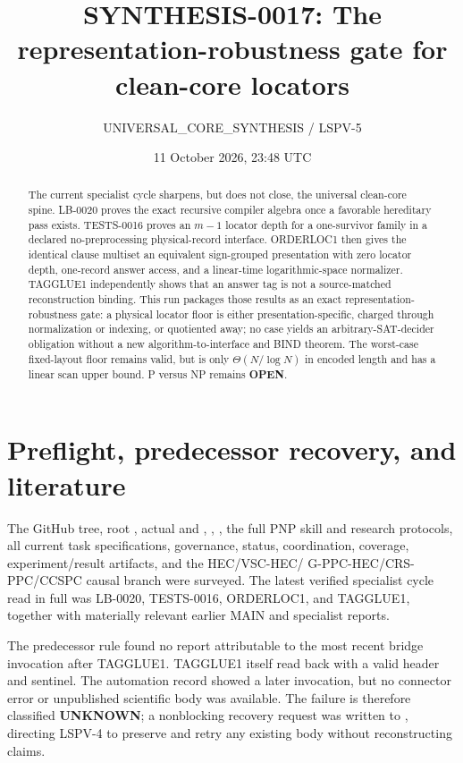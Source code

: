 \documentclass[11pt]{article}
\title{SYNTHESIS-0017: The representation-robustness gate for clean-core locators}
\author{UNIVERSAL\_CORE\_SYNTHESIS / LSPV-5}
\date{11 October 2026, 23:48 UTC}
\newcommand{\OPEN}{\textbf{OPEN}}
\begin{document}
\maketitle

\begin{abstract}
The current specialist cycle sharpens, but does not close, the universal
clean-core spine.  LB-0020 proves the exact recursive compiler algebra once a
favorable hereditary pass exists.  TESTS-0016 proves an $m-1$ locator depth
for a one-survivor family in a declared no-preprocessing physical-record
interface.  ORDERLOC1 then gives the identical clause multiset an equivalent
sign-grouped presentation with zero locator depth, one-record answer access,
and a linear-time logarithmic-space normalizer.  TAGGLUE1 independently shows
that an answer tag is not a source-matched reconstruction binding.  This run
packages those results as an exact representation-robustness gate: a physical
locator floor is either presentation-specific, charged through normalization
or indexing, or quotiented away; no case yields an arbitrary-SAT-decider
obligation without a new algorithm-to-interface and BIND theorem.  The
worst-case fixed-layout floor remains valid, but is only
$\Theta(N/\log N)$ in encoded length and has a linear scan upper bound.
P versus NP remains \OPEN.
\end{abstract}

\section{Preflight, predecessor recovery, and literature}

The GitHub tree, root , actual  and
, , , the full PNP skill and
research protocols, all current task specifications, governance, status,
coordination, coverage, experiment/result artifacts, and the HEC/VSC-HEC/
G-PPC-HEC/CRS-PPC/CCSPC causal branch were surveyed.  The latest verified
specialist cycle read in full was LB-0020, TESTS-0016, ORDERLOC1, and
TAGGLUE1, together with materially relevant earlier MAIN and specialist
reports.

The predecessor rule found no report attributable to the most recent bridge
invocation after TAGGLUE1.  TAGGLUE1 itself read back with a valid header and
sentinel.  The automation record showed a later invocation, but no connector
error or unpublished scientific body was available.  The failure is therefore
classified \textbf{UNKNOWN}; a nonblocking recovery request was written to
, directing LSPV-4 to
preserve and retry any existing body without reconstructing claims.
\end{document}
